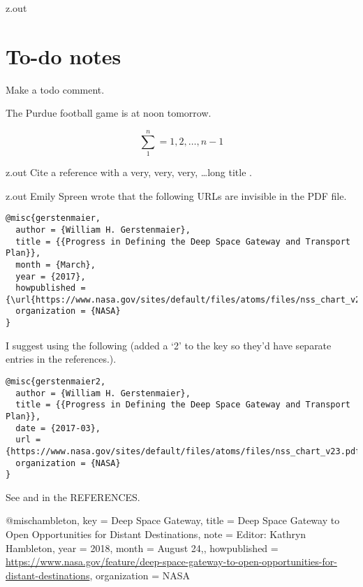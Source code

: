\begin{VerbatimOut}{z.out}


\section{To-do notes}

Make a todo comment.%

The Purdue football game is at noon tomorrow.%

\[
  \sum_1^n = 1, 2, \ldots, n - 1
\]%
\end{VerbatimOut}

\MyIO


\begin{VerbatimOut}{z.out}
Cite a reference with a very, very, very, \ldots long title
\cite{test-long-title}.
\end{VerbatimOut}

\MyIO


\begin{VerbatimOut}{z.out}
Emily Spreen wrote that the following URLs are invisible in the PDF file.

\begin{verbatim}
@misc{gerstenmaier,
  author = {William H. Gerstenmaier},
  title = {{Progress in Defining the Deep Space Gateway and Transport Plan}},
  month = {March},
  year = {2017},
  howpublished = {\url{https://www.nasa.gov/sites/default/files/atoms/files/nss_chart_v23.pdf}},
  organization = {NASA}
}
\end{verbatim}

I suggest using the following
(added a `2' to the key so they'd have separate entries in the references.).
\begin{verbatim}
@misc{gerstenmaier2,
  author = {William H. Gerstenmaier},
  title = {{Progress in Defining the Deep Space Gateway and Transport Plan}},
  date = {2017-03},
  url = {https://www.nasa.gov/sites/default/files/atoms/files/nss_chart_v23.pdf},
  organization = {NASA}
}
\end{verbatim}

See \cite{gerstenmaier} and \cite{gerstenmaier2} in the REFERENCES.
\end{VerbatimOut}


@misc{hambleton,
  key = {Deep Space Gateway},
  title = {{Deep Space Gateway to Open Opportunities for Distant Destinations}},
  note = {Editor: Kathryn Hambleton},
  year = {2018},
  month = {August 24,},
  howpublished = {\url{https://www.nasa.gov/feature/deep-space-gateway-to-open-opportunities-for-distant-destinations}},
  organization = {NASA}
}
              
\MyIO
